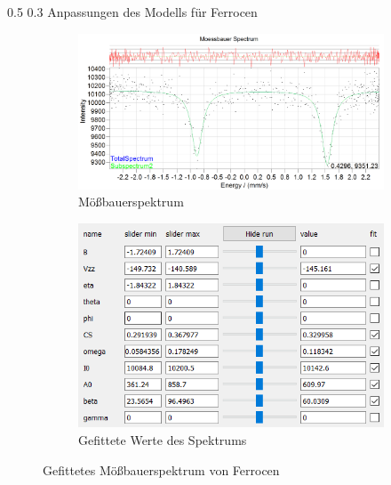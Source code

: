 \documentclass[german, %
parskip=full, %
bibliography=totoc, %
]{scrartcl}
\makeatletter
\renewcommand\subsection{\@startsection 
   {subsection}{2}{0mm}%
   {0.5\baselineskip}%
   {0.3\baselineskip}%
   {\bfseries\sffamily\large}%
   }
\makeatother
\begin{document}
\subsection{Anpassungen des Modells für Ferrocen}

\begin{figure}[ht]
	\centering
	\begin{subfigure}[b]{0.5\textwidth}
		\includegraphics[width=\textwidth]{MoessbauerFerrocen}
	  \caption{Mößbauerspektrum}
	  \label{fig:moessferrocen}
  \end{subfigure}
  \begin{subfigure}[b]{0.4\textwidth}
	  \includegraphics[width=\textwidth]{WerteFerrocen}
	  \caption{Gefittete Werte des Spektrums}
	  \label{fig:werteferrocen}
  \end{subfigure}
	\caption{Gefittetes Mößbauerspektrum von Ferrocen}
\end{figure}
\end{document}
